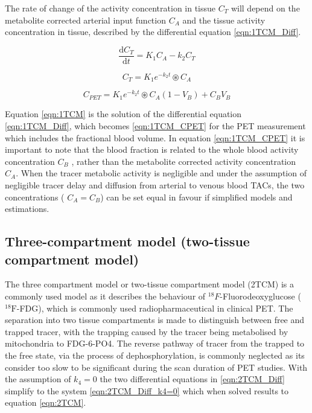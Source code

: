 The rate of change of the activity concentration in tissue $C_T$ will depend on the metabolite corrected arterial input function $C_A$ and the tissue activity concentration in tissue, described by the differential equation \ref{eqn:1TCM_Diff}.

\begin{equation}
  \frac{\mathrm d C_T}{\mathrm d t} = K_1 C_A - k_2 C_T
  \label{eqn:1TCM_Diff}
\end{equation}

\begin{equation}
   C_T = K_1 e^{-k_2 t} \circledast C_A 
  \label{eqn:1TCM}
\end{equation}

\begin{equation}
   C_{PET} =   K_1 e^{-k_2 t} \circledast C_A  (1-V_B) + C_B V_B
  \label{eqn:1TCM_CPET}
\end{equation}

Equation \ref{eqn:1TCM} is the solution of the differential equation \ref{eqn:1TCM_Diff}, which becomes \ref{eqn:1TCM_CPET} for the PET measurement which includes the fractional blood volume. In equation \ref{eqn:1TCM_CPET} it is important to note that the blood fraction is related to the whole blood activity concentration $C_B$ , rather than the metabolite corrected activity concentration $C_A$. When the tracer metabolic activity is negligible and under the assumption of negligible tracer delay and diffusion from arterial to venous blood TACs, the two concentrations ( $C_A = C_B$) can be set equal in favour if simplified models and estimations. 

\subsection{Three-compartment model (two-tissue compartment model)}
The three compartment model or two-tissue compartment model (2TCM) is a commonly used model as it describes the behaviour of ${}^{18}F$-Fluorodeoxyglucose (${}^{18}\mathrm{F}$-FDG), which is commonly used radiopharmaceutical in clinical PET. The separation into two tissue compartments is made to distinguish between free and trapped tracer, with the trapping caused by the tracer being metabolised by mitochondria to FDG-6-PO4. The reverse pathway of tracer from the trapped to the free state, via the process of dephosphorylation, is commonly neglected as its consider too slow to be significant during the scan duration of PET studies. With the assumption of $k_4=0$ the two differential equations in \ref{eqn:2TCM_Diff} simplify to the system \ref{eqn:2TCM_Diff_k4=0} which when solved results to equation \ref{eqn:2TCM}. 

